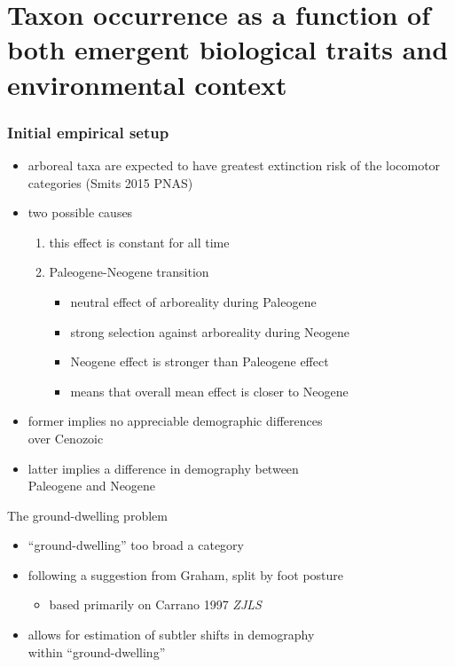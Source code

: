 \documentclass{beamer}
\begin{document}
\section{Taxon occurrence as a function of both emergent biological traits and environmental context}

\begin{frame}
  \frametitle{Initial empirical setup}
  \begin{itemize}
    \item arboreal taxa are expected to have greatest extinction risk of the locomotor categories (Smits 2015 PNAS)
    \item two possible causes
      \begin{enumerate}
        \item this effect is constant for all time
        \item Paleogene-Neogene transition
          \begin{itemize}
            \item neutral effect of arboreality during Paleogene
            \item strong selection against arboreality during Neogene
            \item Neogene effect is stronger than Paleogene effect
            \item means that overall mean effect is closer to Neogene
          \end{itemize}
      \end{enumerate}
    \item former implies no appreciable demographic differences \\over Cenozoic
    \item latter implies a difference in demography between \\Paleogene and Neogene
  \end{itemize}
\end{frame}

\begin{frame}
  \begin{block}{The ground-dwelling problem}
    \begin{itemize}
      \item ``ground-dwelling'' too broad a category
      \item following a suggestion from Graham, split by foot posture
        \begin{itemize}
          \item based primarily on Carrano 1997 \textit{ZJLS}
        \end{itemize}
      \item allows for estimation of subtler shifts in demography \\within ``ground-dwelling''
    \end{itemize}
  \end{block}
\end{frame}
\end{document}
